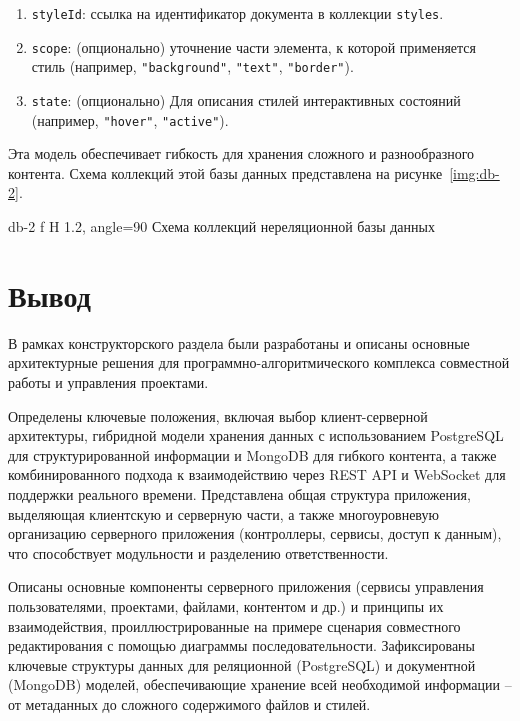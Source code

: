 \begin{enumerate}
\begin{enumerate}
\begin{enumerate}
                \item \texttt{styleId}: ссылка на идентификатор документа в коллекции \texttt{styles}.
                \item \texttt{scope}: (опционально) уточнение части элемента, к которой применяется стиль (например, \texttt{"background"}, \texttt{"text"}, \texttt{"border"}).
                \item \texttt{state}: (опционально) Для описания стилей интерактивных состояний (например, \texttt{"hover"}, \texttt{"active"}).
            \end{enumerate}
    \end{enumerate}
\end{enumerate}

Эта модель обеспечивает гибкость для хранения сложного и разнообразного контента. 
\clearpage
Схема коллекций этой базы данных представлена на рисунке~\ref{img:db-2}.

	{db-2}
	{f}
	{H}
	{1.2\textwidth, angle=90}
	{Схема коллекций нереляционной базы данных}

\section*{Вывод}

В рамках конструкторского раздела были разработаны и описаны основные архитектурные решения для программно-алгоритмического комплекса совместной работы и управления проектами.

Определены ключевые положения, включая выбор клиент-серверной архитектуры, гибридной модели хранения данных с использованием PostgreSQL для структурированной информации и MongoDB для гибкого контента, а также комбинированного подхода к взаимодействию через REST API и WebSocket для поддержки реального времени. 
Представлена общая структура приложения, выделяющая клиентскую и серверную части, а также многоуровневую организацию серверного приложения (контроллеры, сервисы, доступ к данным), что способствует модульности и разделению ответственности.

Описаны основные компоненты серверного приложения (сервисы управления пользователями, проектами, файлами, контентом и др.) и принципы их взаимодействия, проиллюстрированные на примере сценария совместного редактирования с помощью диаграммы последовательности. 
Зафиксированы ключевые структуры данных для реляционной (PostgreSQL) и документной (MongoDB) моделей, обеспечивающие хранение всей необходимой информации – от метаданных до сложного содержимого файлов и стилей. 

